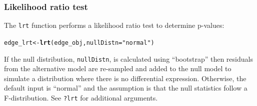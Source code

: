 \documentclass{article}\usepackage[]{graphicx}\usepackage[]{color}
\makeatletter
\newcommand{\hlstr}[1]{\textcolor[rgb]{0.192,0.494,0.8}{#1}}%
\newcommand{\hlstd}[1]{\textcolor[rgb]{0.345,0.345,0.345}{#1}}%
\newcommand{\hlkwb}[1]{\textcolor[rgb]{0.69,0.353,0.396}{#1}}%
\newcommand{\hlkwc}[1]{\textcolor[rgb]{0.333,0.667,0.333}{#1}}%
\newcommand{\hlkwd}[1]{\textcolor[rgb]{0.737,0.353,0.396}{\textbf{#1}}}%
\newenvironment{kframe}{%
 \def\at@end@of@kframe{}%
 \ifinner\ifhmode%
  \def\at@end@of@kframe{\end{minipage}}%
  \begin{minipage}{\columnwidth}%
 \fi\fi%
 \def\FrameCommand##1{\hskip\@totalleftmargin \hskip-\fboxsep
 \colorbox{shadecolor}{##1}\hskip-\fboxsep
     \hskip-\linewidth \hskip-\@totalleftmargin \hskip\columnwidth}%
 \MakeFramed {\advance\hsize-\width
   \@totalleftmargin\z@ \linewidth\hsize
   \@setminipage}}%
 {\par\unskip\endMakeFramed%
 \at@end@of@kframe}
\newenvironment{knitrout}{}{} %
\makeatother
\begin{document}
\subsubsection{Likelihood ratio test}
The {\tt lrt} function performs a likelihood ratio test to determine p-values:
\begin{knitrout}
\color{fgcolor}\begin{kframe}
\begin{alltt}
\hlstd{edge_lrt} \hlkwb{<-} \hlkwd{lrt}\hlstd{(edge_obj,} \hlkwc{nullDistn} \hlstd{=} \hlstr{"normal"}\hlstd{)}
\end{alltt}
\end{kframe}
\end{knitrout}
If the null distribution, {\tt nullDistn}, is calculated using ``bootstrap'' then residuals from the alternative model are re-sampled and added to the null model to simulate a distribution where there is no differential expression. Otherwise, the default input is ``normal'' and the assumption is that the null statistics follow a F-distribution. See {\tt ?lrt} for additional arguments.
\end{document}
